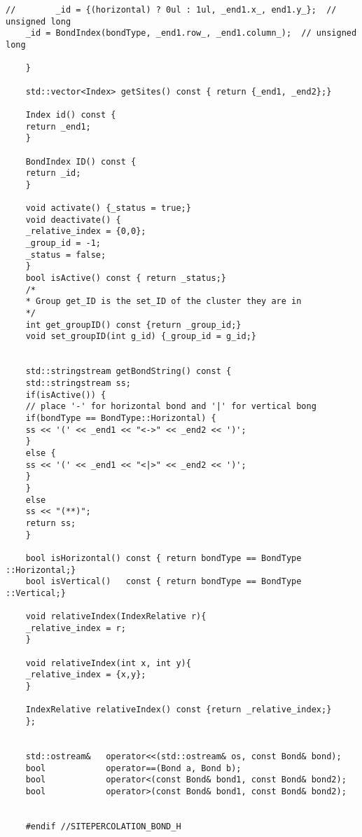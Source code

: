 \begin{lstlisting}[style=CStyle]
	//        _id = {(horizontal) ? 0ul : 1ul, _end1.x_, end1.y_};  // unsigned long
	_id = BondIndex(bondType, _end1.row_, _end1.column_);  // unsigned long
	
	}
	
	std::vector<Index> getSites() const { return {_end1, _end2};}
	
	Index id() const {
	return _end1;
	}
	
	BondIndex ID() const {
	return _id;
	}
	
	void activate() {_status = true;}
	void deactivate() {
	_relative_index = {0,0};
	_group_id = -1;
	_status = false;
	}
	bool isActive() const { return _status;}
	/*
	* Group get_ID is the set_ID of the cluster they are in
	*/
	int get_groupID() const {return _group_id;}
	void set_groupID(int g_id) {_group_id = g_id;}
	
	
	std::stringstream getBondString() const {
	std::stringstream ss;
	if(isActive()) {
	// place '-' for horizontal bond and '|' for vertical bong
	if(bondType == BondType::Horizontal) {
	ss << '(' << _end1 << "<->" << _end2 << ')';
	}
	else {
	ss << '(' << _end1 << "<|>" << _end2 << ')';
	}
	}
	else
	ss << "(**)";
	return ss;
	}
	
	bool isHorizontal() const { return bondType == BondType ::Horizontal;}
	bool isVertical()   const { return bondType == BondType ::Vertical;}
	
	void relativeIndex(IndexRelative r){
	_relative_index = r;
	}
	
	void relativeIndex(int x, int y){
	_relative_index = {x,y};
	}
	
	IndexRelative relativeIndex() const {return _relative_index;}
	};
	
	
	std::ostream&   operator<<(std::ostream& os, const Bond& bond);
	bool            operator==(Bond a, Bond b);
	bool            operator<(const Bond& bond1, const Bond& bond2);
	bool            operator>(const Bond& bond1, const Bond& bond2);
	
	
	#endif //SITEPERCOLATION_BOND_H
	
	\end{lstlisting}
	
